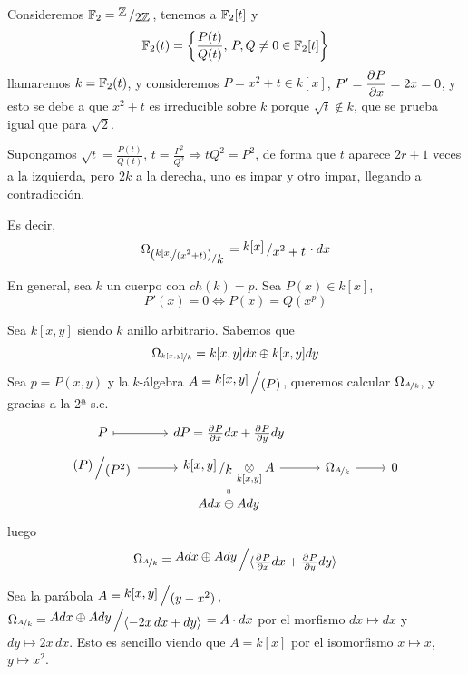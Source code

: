 \begin{ejem}    
    Consideremos $\bb F_2 = \modulo{\bb Z}{2 \bb Z}$, tenemos a $\mathbb{F}_2[t]$ y
    $$\mathbb{F}_2(t) = \left\{ \frac{P(t)}{Q(t)}, \, P, Q\neq 0 \in \mathbb{F}_2[t] \right\}$$
    llamaremos $k=\mathbb{F}_2(t)$, y consideremos $P=x^2+t \in k[x]$, $P'=\dfrac{\partial^{} P}{\partial x}=2x=0$, y esto se debe a que $x^2+t$ es irreducible sobre $k$ porque $\sqrt t \nin k $, que se prueba igual que para $\sqrt 2$.

    Supongamos $\sqrt{ t} = \frac{P(t)}{Q(t)}$, $t = \frac{P^2}{Q^2} \Rightarrow t Q^2 = P^2$, de forma que $t$ aparece $2r+1$ veces a la izquierda, pero $2k$ a la derecha, uno es impar y otro impar, llegando a contradicci\'on. 

    Es decir, 
    $$\Omega_{\modulo{(\nicefrac{k[x]}{(x^2+t)})}{k}} = \modulo{k[x]}{x^2+t} \cdot dx$$
\end{ejem}
\begin{ejem}
    En general, sea $k$ un cuerpo con $ch(k)=p$. Sea $P(x) \in k[x]$, $$P'(x) = 0\iff P(x) = Q(x^p)$$
\end{ejem}
\begin{ejem}
    Sea $k[x, y]$ siendo $k$ anillo arbitrario. Sabemos que 
    $$\Omega_{\nicefrac{k[x,y]}{k}} = k[x,y] dx \oplus k[x,y] dy$$
    Sea $p = P(x,y)$ y la $k$-\'algebra $A=\modulo{k[x,y]}{(P)}$, queremos calcular $\Omega_{\nicefrac{A}{k}}$, y gracias a la 2ª s.e.
    $$\bt 
    P \rarmaps & dP = \pdd{P}{x} dx + \pdd{P}{y} dy \\[-5mm]
    \modulo{(P)}{(P^2)} \rar & \modulo{k[x,y]}{k} \underset{k[x,y]}{\otimes} A \rar & \Omega_{\nicefrac{A}{k}} \rar & 0 \\[-5mm]
    & Adx\oplus A dy \arrow[equal]{u} & & 
    \et$$
    luego 
    $$\Omega_{\nicefrac{A}{k}} = \modulo{Adx\oplus A dy}{\langle \pdd{P}{x} dx + \pdd{P}{y} dy \rangle }$$
\end{ejem}
\begin{ejem}
    Sea la par\'abola $A = \modulo{k[x,y]}{(y-x^2)}$, $\Omega_{\nicefrac{A}{k}} = \modulo{Adx\oplus A dy}{\langle -2x \, dx + dy \rangle } = A\cdot dx$ por el morfismo $dx \longmapsto dx$ y $dy \longmapsto 2x\, dx$. Esto es sencillo viendo que $A = k[x]$ por el isomorfismo $x\longmapsto x$, $y \longmapsto x^2$.
\end{ejem}

